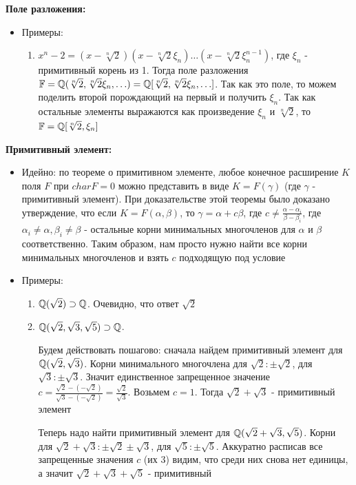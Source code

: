 \par \textbf{Поле разложения:}
\begin{itemize}
    \item Примеры:
    \begin{enumerate}
        \item $x^n-2=(x-\sqrt[n]{2})(x-\sqrt[n]{2}\xi_n)\ldots(x-\sqrt[n]{2}\xi_n^{n-1})$, где $\xi_n$ - примитивный корень из 1. Тогда поле разложения $\mathbb{F}=\mathbb{Q}(\sqrt[n]{2}, \sqrt[n]{2}\xi_n, \ldots)=\mathbb{Q}[\sqrt[n]{2}, \sqrt[n]{2}\xi_n, \ldots]$. Так как это поле, то можем поделить второй порождающий на первый и получить $\xi_n$. Так как остальные элементы выражаются как произведение $\xi_n$ и $\sqrt[n]{2}$, то $\mathbb{F}=\mathbb{Q}[\sqrt[n]{2}, \xi_n]$
    \end{enumerate}
\end{itemize} 

\par \textbf{Примитивный элемент:}
\begin{itemize}
    \item  Идейно: по теореме о примитивном элементе, любое конечное расширение $K$ поля $F$ при $char F = 0$ можно представить в виде $K=F(\gamma)$ (где $\gamma$ - примитивный элемент). При доказательстве этой теоремы было доказано утверждение, что если $K=F(\alpha, \beta)$, то $\gamma=\alpha+c\beta$, где $c\neq \frac{\alpha-\alpha_i}{\beta-\beta_i}$, где $\alpha_i \neq \alpha, \beta_i \neq \beta$ - остальные корни минимальных многочленов для $\alpha$ и $\beta$ соответственно. Таким образом, нам просто нужно найти все корни минимальных многочленов и взять $c$ подходящую под условие
    \item Примеры: 
    \begin{enumerate}
        \item $\mathbb{Q}(\sqrt{2})\supset \mathbb{Q}$. Очевидно, что ответ $\sqrt{2}$
        \item $\mathbb{Q}(\sqrt{2}, \sqrt{3}, \sqrt{5})\supset \mathbb{Q}$.
        \par Будем действовать пошагово: сначала найдем примитивный элемент для $\mathbb{Q}(\sqrt{2}, \sqrt{3})$. Корни минимального многочлена для $\sqrt{2}: \pm \sqrt{2}$, для $\sqrt{3}: \pm \sqrt{3}$. Значит единственное запрещенное значение $c=\frac{\sqrt{2}-(-\sqrt{2})}{\sqrt{3}-(-\sqrt{2})}=\frac{\sqrt{2}}{\sqrt{3}}$. Возьмем $c=1$. Тогда $\sqrt{2}+\sqrt{3}$ - примитивный элемент
        \par Теперь надо найти примитивный элемент для $\mathbb{Q}(\sqrt{2}+\sqrt{3}, \sqrt{5})$. Корни для $\sqrt{2}+\sqrt{3}: \pm \sqrt{2} \pm \sqrt{3}$, для $\sqrt{5}: \pm \sqrt{5}$. Аккуратно расписав все запрещенные значения $c$ (их 3) видим, что среди них снова нет единицы, а значит $\sqrt{2}+\sqrt{3}+\sqrt{5}$ - примитивный
    \end{enumerate}
\end{itemize}
